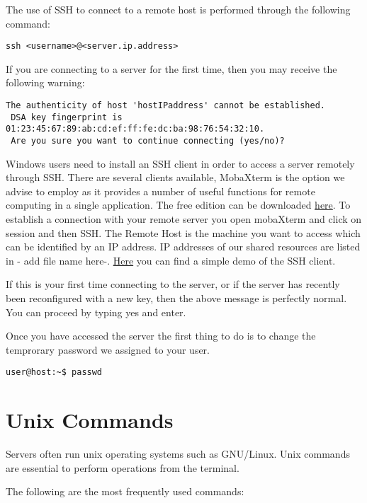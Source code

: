 \documentclass[
]{book}
\begin{document}
The use of SSH to connect to a remote host is performed through the following command:

\begin{verbatim}
ssh <username>@<server.ip.address>
\end{verbatim}

If you are connecting to a server for the first time, then you may receive the following warning:

\begin{verbatim}
The authenticity of host 'hostIPaddress' cannot be established.
 DSA key fingerprint is 01:23:45:67:89:ab:cd:ef:ff:fe:dc:ba:98:76:54:32:10.
 Are you sure you want to continue connecting (yes/no)?
\end{verbatim}

Windows users need to install an SSH client in order to access a server remotely through SSH. There are several clients available, MobaXterm is the option we advise to employ as it provides a number of useful functions for remote computing in a single application.
The free edition can be downloaded \href{https://mobaxterm.mobatek.net/download.html}{here}. To establish a connection with your remote server you open mobaXterm and click on session and then SSH. The Remote Host is the machine you want to access which can be identified by an IP address. IP addresses of our shared resources are listed in - add file name here-.
\href{https://mobaxterm.mobatek.net/demo.html}{Here} you can find a simple demo of the SSH client.

If this is your first time connecting to the server, or if the server has recently been
reconfigured with a new key, then the above message is perfectly normal. You can proceed by typing yes and enter.

Once you have accessed the server the first thing to do is to change the temprorary password we assigned to your user.

\begin{verbatim}
user@host:~$ passwd
\end{verbatim}

\hypertarget{unix-commands}{%
\section{Unix Commands}\label{unix-commands}}

Servers often run unix operating systems such as GNU/Linux. Unix commands are essential to perform operations from the terminal.

The following are the most frequently used commands:
\end{document}

